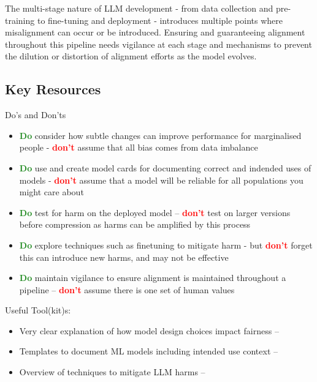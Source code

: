 The multi-stage nature of LLM development - from data collection and pre-training to fine-tuning and deployment - introduces multiple points where misalignment can occur or be introduced. Ensuring and guaranteeing alignment throughout this pipeline needs vigilance at each stage and mechanisms to prevent the dilution or distortion of alignment efforts as the model evolves. 


\subsection{Key Resources}
Do's and Don'ts
\begin{itemize}
    \item \textcolor{ForestGreen}{\textbf{Do}} consider how subtle changes can improve performance for marginalised people - \textcolor{red}{\textbf{don't}} assume that all bias comes from data imbalance 
    \item \textcolor{ForestGreen}{\textbf{Do}} use and create model cards for documenting correct and indended uses of models - \textcolor{red}{\textbf{don't}} assume that a model will be reliable for all populations you might care about
    \item \textcolor{ForestGreen}{\textbf{Do}} test for harm on the deployed model -- \textcolor{red}{\textbf{don't}} test on larger versions before compression as harms can be amplified by this process
    \item \textcolor{ForestGreen}{\textbf{Do}} explore techniques such as finetuning to mitigate harm - but \textcolor{red}{\textbf{don't}} forget this can introduce new harms, and may not be effective
    \item \textcolor{ForestGreen}{\textbf{Do}} maintain vigilance to ensure alignment is maintained throughout a pipeline -- \textcolor{red}{\textbf{don't}} assume there is one set of human values 
\end{itemize}

\noindent Useful Tool(kit)s: 
\begin{itemize}
    \item Very clear explanation of how model design choices impact fairness -- \citet{hooker_moving_2021}
    \item Templates to document ML models including intended use context -- \citet{mitchell_model_2019}
    \item Overview of techniques to mitigate LLM harms -- \citet{kumar_language_2022}
\end{itemize}